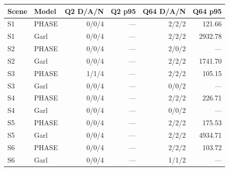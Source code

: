 \begin{tabular}{llrrrr}
\toprule
Scene & Model & Q2 D/A/N & Q2 p95 & Q64 D/A/N & Q64 p95 \\
\midrule
S1 & PHASE & 0/0/4 & --- & 2/2/2 & 121.66 \\
S1 & Garl & 0/0/4 & --- & 2/2/2 & 2932.78 \\
S2 & PHASE & 0/0/4 & --- & 2/0/2 & --- \\
S2 & Garl & 0/0/4 & --- & 2/2/2 & 1741.70 \\
S3 & PHASE & 1/1/4 & --- & 2/2/2 & 105.15 \\
S3 & Garl & 0/0/4 & --- & 0/0/2 & --- \\
S4 & PHASE & 0/0/4 & --- & 2/2/2 & 226.71 \\
S4 & Garl & 0/0/4 & --- & 0/0/2 & --- \\
S5 & PHASE & 0/0/4 & --- & 2/2/2 & 175.53 \\
S5 & Garl & 0/0/4 & --- & 2/2/2 & 4934.71 \\
S6 & PHASE & 0/0/4 & --- & 2/2/2 & 103.72 \\
S6 & Garl & 0/0/4 & --- & 1/1/2 & --- \\
\bottomrule
\end{tabular}

